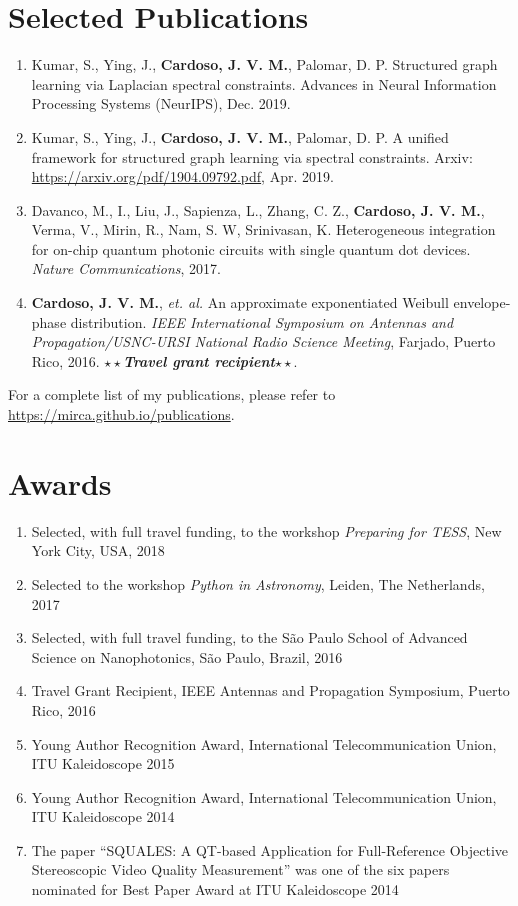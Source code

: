 \documentclass[10pt]{article}
\begin{document}
\begin{titlepage}
\section*{Selected Publications}
\begin{enumerate}
  \item Kumar, S., Ying, J., \textbf{Cardoso, J. V. M.}, Palomar, D. P. Structured graph learning via Laplacian
  spectral constraints. Advances in Neural Information Processing Systems (NeurIPS), Dec. 2019.
  \item Kumar, S., Ying, J., \textbf{Cardoso, J. V. M.}, Palomar, D. P. A unified framework for structured graph
  learning via spectral constraints. Arxiv: \url{https://arxiv.org/pdf/1904.09792.pdf}, Apr. 2019.
\item Davanco, M., I., Liu, J., Sapienza, L., Zhang, C. Z., \textbf{Cardoso, J. V. M.}, Verma, V., Mirin, R., Nam,
S. W, Srinivasan, K. Heterogeneous integration for on-chip quantum photonic circuits with single quantum dot devices.
\textit{Nature Communications}, 2017.
\item \textbf{Cardoso, J. V. M.}, \textit{et. al.} An approximate exponentiated Weibull envelope-phase distribution.
\textit{IEEE International Symposium on Antennas and Propagation/USNC-URSI National Radio Science Meeting}, Farjado, Puerto Rico, 2016.
$\star\star$\textbf{\textit{Travel grant recipient}}$\star\star$.
\end{enumerate}

For a complete list of my publications, please refer to \url{https://mirca.github.io/publications}.

\section*{Awards}
\begin{enumerate}
  \item Selected, with full travel funding, to the workshop \textit{Preparing for TESS}, New York City, USA, 2018
  \item Selected to the workshop \textit{Python in Astronomy}, Leiden, The Netherlands, 2017
  \item Selected, with full travel funding, to the S\~ao Paulo School of Advanced Science on Nanophotonics, S\~ao Paulo, Brazil, 2016
  \item Travel Grant Recipient, IEEE Antennas and Propagation Symposium, Puerto Rico, 2016
  \item Young Author Recognition Award, International Telecommunication Union, ITU Kaleidoscope 2015
  \item Young Author Recognition Award, International Telecommunication Union, ITU Kaleidoscope 2014
  \item The paper ``SQUALES: A QT-based Application for Full-Reference Objective Stereoscopic
      Video Quality Measurement'' was one of the six papers nominated for Best Paper Award at ITU Kaleidoscope 2014
\end{enumerate}


\end{titlepage}
\end{document}

